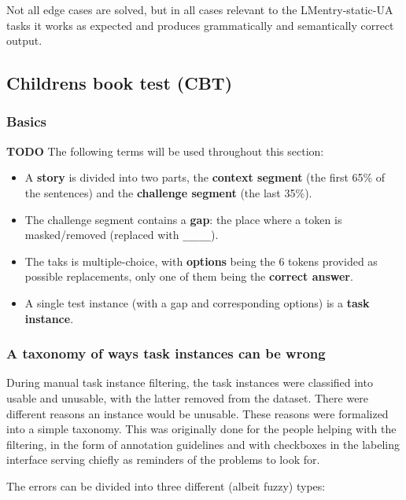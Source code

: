 Not all edge cases are solved, but in all cases relevant to the
LMentry-static-UA tasks it works as expected and produces grammatically
and semantically correct output.

\subsection{Children\textquotesingle s book test
(CBT)}\label{childrens-book-test-cbt}

\subsubsection{Basics}\label{basics}

\textbf{TODO} The following terms will be used throughout this section:

\begin{itemize}
\tightlist
\item
  A \textbf{story} is divided into two parts, the \textbf{context
  segment} (the first 65\% of the sentences) and the \textbf{challenge
  segment} (the last 35\%).
\item
  The challenge segment contains a \textbf{gap}: the place where a token
  is masked/removed (replaced with \texttt{\_\_\_\_\_}).
\item
  The taks is multiple-choice, with \textbf{options} being the 6 tokens
  provided as possible replacements, only one of them being the
  \textbf{correct answer}.
\item
  A single test instance (with a gap and corresponding options) is a
  \textbf{task instance}.
\end{itemize}

\subsubsection{A taxonomy of ways task instances can be
wrong}\label{a-taxonomy-of-ways-task-instances-can-be-wrong}

During manual task instance filtering, the task instances were
classified into usable and unusable, with the latter removed from the
dataset. There were different reasons an instance would be unusable.
These reasons were formalized into a simple taxonomy. This was
originally done for the people helping with the filtering, in the form
of annotation guidelines and with checkboxes in the labeling interface
serving chiefly as reminders of the problems to look for.

The errors can be divided into three different (albeit fuzzy) types:

